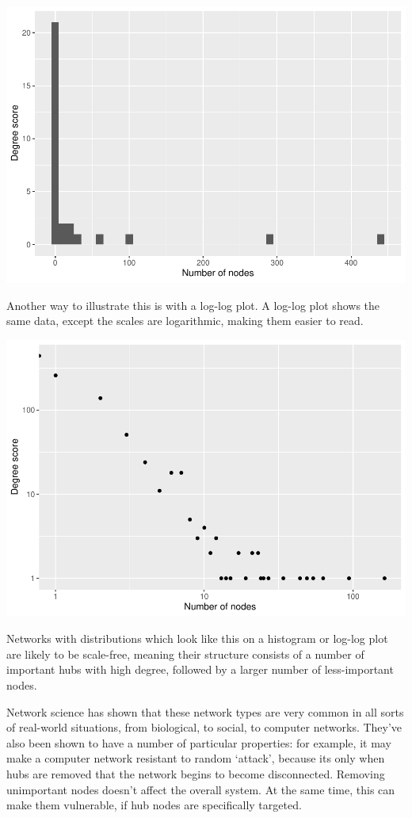\documentclass[
]{book}
\begin{document}
\includegraphics{_main_files/figure-latex/unnamed-chunk-33-1.pdf}

Another way to illustrate this is with a log-log plot. A log-log plot shows the same data, except the scales are logarithmic, making them easier to read.

\includegraphics{_main_files/figure-latex/unnamed-chunk-34-1.pdf}

Networks with distributions which look like this on a histogram or log-log plot are likely to be scale-free, meaning their structure consists of a number of important hubs with high degree, followed by a larger number of less-important nodes.

Network science has shown that these network types are very common in all sorts of real-world situations, from biological, to social, to computer networks. They've also been shown to have a number of particular properties: for example, it may make a computer network resistant to random `attack', because its only when hubs are removed that the network begins to become disconnected. Removing unimportant nodes doesn't affect the overall system. At the same time, this can make them vulnerable, if hub nodes are specifically targeted.
\end{document}
